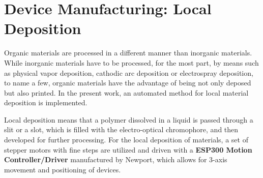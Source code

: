 
\section{Device Manufacturing: Local Deposition}
\label{ch:LD}
Organic materials are processed in a different manner than inorganic materials. While inorganic materials have to be processed, for the most part, by means such as physical vapor deposition, cathodic arc deposition or electrospray deposition, to name a few, organic materials have the advantage of being not only deposed but also printed. In the present work, an automated method for local material deposition is implemented. 


Local deposition means that a polymer dissolved in a liquid is passed through a slit or a slot, which is filled with the electro-optical chromophore, and then developed for further processing. For the local deposition of materials, a set of stepper motors with fine steps are utilized and driven with a \textbf{ESP300 Motion Controller/Driver} manufactured by Newport, which allows for 3-axis movement and positioning of devices.  %

